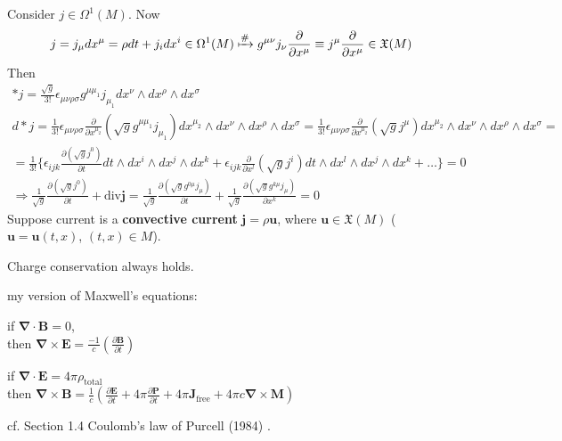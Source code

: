 \documentclass[10pt]{amsart}
\begin{document}
\begin{multicols*}{2}
Consider $j \in \Omega^1(M)$.  Now
\[
j = j_{\mu} dx^{\mu} = \rho dt + j_i dx^i \in \Omega^1(M) \xmapsto{ \#} g^{\mu \nu} j_{\nu} \frac{ \partial }{ \partial x^{\mu } } \equiv j^{\mu} \frac{ \partial }{ \partial x^{\mu }} \in \mathfrak{X}(M)
\]
Then
\[
\begin{gathered}
  *j = \frac{ \sqrt{g}}{3!} \epsilon_{\mu \nu \rho \sigma} g^{\mu \mu_1} j_{\mu_1} dx^{\nu} \wedge dx^{\rho} \wedge dx^{\sigma} \\ 
  d*j = \frac{1}{3!} \epsilon_{\mu \nu \rho \sigma} \frac{ \partial }{ \partial x^{\mu_2} }(\sqrt{g} g^{\mu \mu_1} j_{\mu_1} ) dx^{\mu_2} \wedge dx^{\nu} \wedge dx^{\rho} \wedge dx^{\sigma} = \frac{1}{3!} \epsilon_{\mu \nu \rho \sigma} \frac{ \partial}{ \partial x^{\mu_2} } (\sqrt{g} j^{\mu } ) dx^{\mu_2} \wedge dx^{\nu} \wedge dx^{\rho} \wedge dx^{\sigma} = \\
  = \frac{1}{3!} \lbrace \epsilon_{ijk} \frac{ \partial ( \sqrt{g}j^0  ) }{ \partial t} dt \wedge dx^i \wedge dx^j \wedge dx^k + \epsilon_{ijk} \frac{ \partial }{ \partial x^l} ( \sqrt{g}j^i )  dt \wedge dx^l \wedge dx^j \wedge dx^k + \dots \rbrace = 0  \\
  \Longrightarrow \frac{1}{\sqrt{g}} \frac{ \partial (\sqrt{g} j^0  ) }{ \partial t} + \text{div}\mathbf{j} = \frac{1}{\sqrt{g}} \frac{ \partial ( \sqrt{g} g^{0 \mu } j_{\mu } ) }{ \partial t} + \frac{1}{\sqrt{g}} \frac{ \partial ( \sqrt{g} g^{k\mu } j_{\mu} ) }{ \partial x^k }  = 0 
\end{gathered}
\]
Suppose current is a \textbf{convective current} $\mathbf{j} = \rho \mathbf{u}$, where $\mathbf{u} \in \mathfrak{X}(M)$ ($\mathbf{u} = \mathbf{u}(t,x)$, $(t,x) \in M$).

Charge conservation always holds.  


my version of Maxwell's equations:

if $\mathbf{\nabla} \cdot \mathbf{B} = 0$, \\
then $\mathbf{\nabla} \times \mathbf{E} = \frac{-1}{c} \left( \frac{ \partial \mathbf{B} }{ \partial t} \right)$

if $\mathbf{\nabla} \cdot \mathbf{E} = 4\pi \rho_{\text{total}}$ \\
then $\mathbf{\nabla} \times \mathbf{B} = \frac{1}{c} \left( \frac{ \partial \mathbf{E} }{ \partial t} + 4\pi \frac{ \partial \mathbf{P} }{ \partial t} + 4\pi \mathbf{J}_{\text{free}} + 4\pi c \mathbf{\nabla}\times \mathbf{M}\right)$



cf. Section 1.4 Coulomb's law of Purcell (1984) \cite{Purcell1984}.


\end{multicols*}
\end{document}

